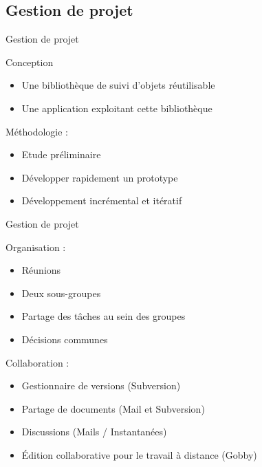\documentclass{beamer}
\begin{document}
      \subsection{Gestion de projet}
            \begin{frame}{Gestion de projet}
                  \begin{block}{Conception}
			\begin{itemize}
                  		\item Une bibliothèque de suivi d'objets réutilisable
                        	\item Une application  exploitant cette bibliothèque
			\end{itemize}
                  \end{block}
		  \begin{block}{Méthodologie :}
                 	 \begin{itemize}
                  	\item Etude préliminaire
                 	 \item Développer rapidement un prototype
                 	 \item Développement incrémental et itératif
                	  \end{itemize}
                  \end{block}
            \end{frame}
            
            \begin{frame}{Gestion de projet}
                  \begin{block}{Organisation :}
                  \begin{itemize}
                        \item{Réunions}
                        \item{Deux sous-groupes}
                        \item{Partage des tâches au sein des groupes}
                        \item{Décisions communes}
                  \end{itemize}
                  \end{block}
            
		\begin{block}{Collaboration :}
			\begin{itemize}
			\item{Gestionnaire de versions (Subversion)}
			\item{Partage de documents (Mail et Subversion)}
			\item{Discussions (Mails / Instantanées)}
			\item{Édition collaborative pour le travail à distance (Gobby)}
			\end{itemize}
		\end{block}
            \end{frame}
            
\end{document}

